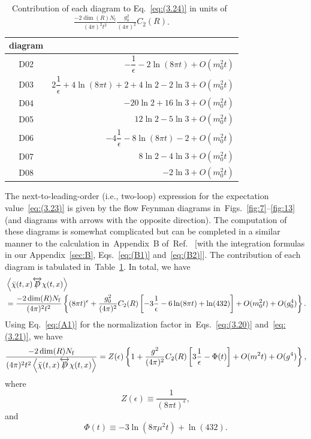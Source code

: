\begin{table}
\caption{Contribution of each diagram to Eq.~\eqref{eq:(3.24)} in units
of~$\frac{-2\dim(R)N_{\mathrm{f}}}{(4\pi)^2t^2}\frac{g_0^2}{(4\pi)^2}C_2(R)$.}
\label{table:1}
\begin{center}
\renewcommand{\arraystretch}{2.2}
\setlength{\tabcolsep}{20pt}
\begin{tabular}{cr}
\toprule
 diagram & \\
\midrule
 D02 & $-\dfrac{1}{\epsilon}-2\ln(8\pi t)+O(m_0^2t)$ \\
 D03 & $2\dfrac{1}{\epsilon}+4\ln(8\pi t)+2+4\ln2-2\ln3+O(m_0^2t)$ \\
 D04 & $-20\ln2+16\ln3+O(m_0^2t)$ \\
 D05 & $12\ln2-5\ln3+O(m_0^2t)$ \\
 D06 & $-4\dfrac{1}{\epsilon}-8\ln(8\pi t)-2+O(m_0^2t)$ \\
 D07 & $8\ln2-4\ln3+O(m_0^2t)$ \\
 D08 & $-2\ln3+O(m_0^2t)$ \\
\bottomrule
\end{tabular}
\end{center}
\end{table}

The next-to-leading-order (i.e., two-loop) expression for the expectation
value~\eqref{eq:(3.23)} is given by the flow Feynman diagrams
in~Figs.~\ref{fig:7}--\ref{fig:13} (and diagrams with arrows with the opposite
direction). The computation of these diagrams is somewhat complicated but can
be completed in a similar manner to the calculation in~Appendix~B
of~Ref.~\cite{Luscher:2010iy} [with the integration formulas in our
Appendix~\ref{sec:B}, Eqs.~\eqref{eq:(B1)} and~\eqref{eq:(B2)}]. The
contribution of each diagram is tabulated in~Table~\ref{table:1}. In total, we
have
\begin{align}
   &\left\langle\Bar{\chi}(t,x)\overleftrightarrow{\Slash{D}}\chi(t,x)
   \right\rangle
\notag\\
   &=\frac{-2\dim(R)N_{\mathrm{f}}}{(4\pi)^2t^2}
   \left\{(8\pi t)^\epsilon
   +\frac{g_0^2}{(4\pi)^2}C_2(R)
   \left[-3\frac{1}{\epsilon}-6\ln(8\pi t)+\ln(432)\right]
   +O(m_0^2t)+O(g_0^4)\right\}.
\label{eq:(3.24)}
\end{align}
Using Eq.~\eqref{eq:(A1)} for the normalization factor
in~Eqs.~\eqref{eq:(3.20)} and~\eqref{eq:(3.21)}, we have
\begin{equation}
   \frac{-2\dim(R)N_{\mathrm{f}}}
   {(4\pi)^2t^2\left\langle\Bar{\chi}(t,x)
   \overleftrightarrow{\Slash{D}}\chi(t,x)\right\rangle}
   =Z(\epsilon)
   \left\{1+\frac{g^2}{(4\pi)^2}C_2(R)\left[3\frac{1}{\epsilon}-\Phi(t)\right]
   +O(m^2t)+O(g^4)\right\},
\label{eq:(3.25)}
\end{equation}
where
\begin{equation}
   Z(\epsilon)\equiv\frac{1}{(8\pi t)^\epsilon},
\label{eq:(3.26)}
\end{equation}
and
\begin{equation}
   \Phi(t)\equiv-3\ln(8\pi\mu^2t)+\ln(432).
\label{eq:(3.27)}
\end{equation}
